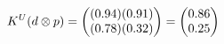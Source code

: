 \documentclass[preview]{standalone}
\begin{document}
\begin{align*}
\special{dvisvgm:raw <g id='unique000'>}K^U(d \otimes p) = \begin{pmatrix} (0.94)(0.91) \\ (0.78)(0.32) \end{pmatrix} = \begin{pmatrix} 0.86 \\ 0.25 \end{pmatrix}\special{dvisvgm:raw </g>}
\end{align*}
\end{document}
